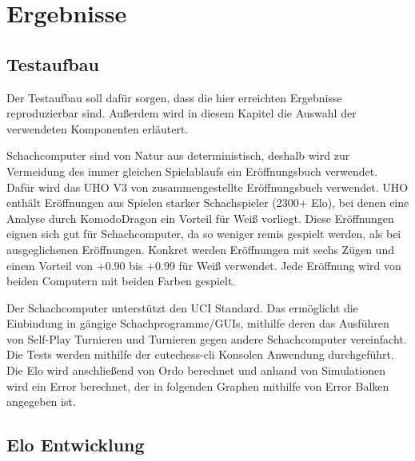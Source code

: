 \chapter{Ergebnisse}
\label{chap:Ergebnisse}

\section{Testaufbau}

Der Testaufbau soll dafür sorgen, dass die hier erreichten Ergebnisse reproduzierbar sind. Außerdem wird in diesem Kapitel die Auswahl der verwendeten Komponenten erläutert.

Schachcomputer sind von Natur aus deterministisch, deshalb wird zur Vermeidung des immer gleichen Spielablaufs ein Eröffnungsbuch verwendet. Dafür wird das \ac{UHO} V3 von \citeauthor{Pohl2021} \cite{Pohl2021} zusammengestellte Eröffnungsbuch verwendet. \ac{UHO} enthält Eröffnungen aus Spielen starker Schachspieler (2300+ Elo), bei denen eine Analyse durch KomodoDragon \cite{KomodoDragon} ein Vorteil für Weiß vorliegt. Diese Eröffnungen eignen sich gut für Schachcomputer, da so weniger remis gespielt werden, als bei ausgeglichenen Eröffnungen. Konkret werden Eröffnungen mit sechs Zügen und einem Vorteil von +0.90 bis +0.99 für Weiß verwendet. Jede Eröffnung wird von beiden Computern mit beiden Farben gespielt.

Der Schachcomputer unterstützt den \ac{UCI} Standard. Das ermöglicht die Einbindung in gängige Schachprogramme/GUIs, mithilfe deren das Ausführen von Self-Play Turnieren und Turnieren gegen andere Schachcomputer vereinfacht. Die Tests werden mithilfe der cutechess-cli \cite{CutechessRepo} Konsolen Anwendung durchgeführt. Die Elo wird anschließend von Ordo \cite{OrdoRepo} berechnet und anhand von Simulationen wird ein Error berechnet, der in folgenden Graphen mithilfe von Error Balken angegeben ist.

\section{Elo Entwicklung}


